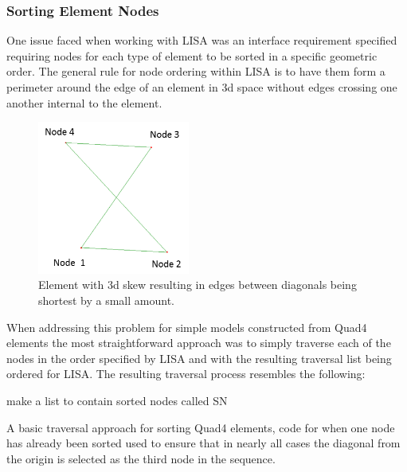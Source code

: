 \subsubsection{Sorting Element Nodes}
One issue faced when working with LISA was an interface requirement specified requiring nodes for each type of element to be sorted in a specific geometric order. The general rule for node ordering within LISA is to have them form a perimeter around the edge of an element in 3d space without edges crossing one another internal to the element. \\

\begin{figure}[!h]
  \centerline{\includegraphics[width=50mm , scale=1]{../Graphics/BadlyOrderedNodes.png}}
  \caption{Element with 3d skew resulting in edges between diagonals being shortest by a small amount.
  }
  \label{fig:h-refinementImp}
\end{figure}

\noindent
When addressing this problem for simple models constructed from Quad4 elements the most straightforward approach was to simply traverse each of the nodes in the order specified by LISA and with the resulting traversal list being ordered for LISA. The resulting traversal process resembles the following: \\
	


\begin{algorithm}[H]
 make a list to contain sorted nodes called SN
 \caption{A basic traversal approach for sorting Quad4 elements, code for when one node has already been sorted used to ensure that in nearly all cases the diagonal from the origin is selected as the third node in the sequence.}
\end{algorithm}

